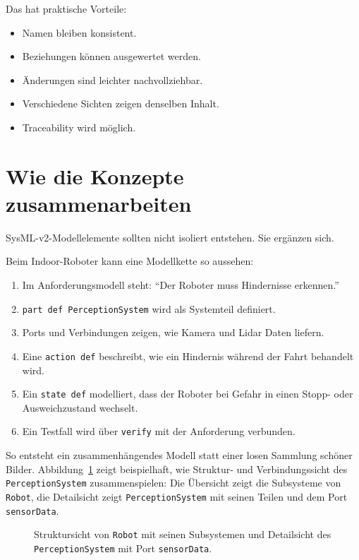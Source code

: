Das hat praktische Vorteile:

\begin{itemize}
    \item Namen bleiben konsistent.
    \item Beziehungen können ausgewertet werden.
    \item Änderungen sind leichter nachvollziehbar.
    \item Verschiedene Sichten zeigen denselben Inhalt.
    \item Traceability wird möglich.
\end{itemize}

\section{Wie die Konzepte zusammenarbeiten}
SysML-v2-Modellelemente sollten nicht isoliert entstehen. Sie ergänzen sich.

Beim Indoor-Roboter kann eine Modellkette so aussehen:

\begin{enumerate}
    \item Im Anforderungsmodell steht: \enquote{Der Roboter muss Hindernisse erkennen.}
    \item \texttt{part def PerceptionSystem} wird als Systemteil definiert.
    \item Ports und Verbindungen zeigen, wie Kamera und Lidar Daten liefern.
    \item Eine \texttt{action def} beschreibt, wie ein Hindernis während der Fahrt behandelt wird.
    \item Ein \texttt{state def} modelliert, dass der Roboter bei Gefahr in einen Stopp- oder Ausweichzustand wechselt.
    \item Ein Testfall wird über \texttt{verify} mit der Anforderung verbunden.
\end{enumerate}

So entsteht ein zusammenhängendes Modell statt einer losen Sammlung schöner Bilder. Abbildung~\ref{fig:kap03-struktur-verbindungssicht} zeigt beispielhaft, wie Struktur- und Verbindungssicht des \texttt{PerceptionSystem} zusammenspielen: Die Übersicht zeigt die Subsysteme von \texttt{Robot}, die Detailsicht zeigt \texttt{PerceptionSystem} mit seinen Teilen und dem Port \texttt{sensorData}.

\begin{figure}[H]
  \centering
  \caption{Struktursicht von \texttt{Robot} mit seinen Subsystemen und Detailsicht des \texttt{PerceptionSystem} mit Port \texttt{sensorData}.}
  \label{fig:kap03-struktur-verbindungssicht}
\end{figure}

